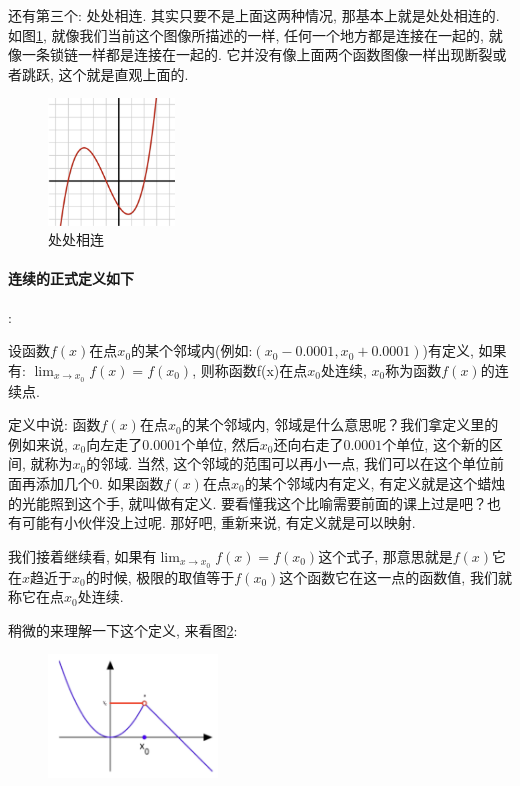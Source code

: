 还有第三个: 处处相连. 其实只要不是上面这两种情况, 那基本上就是处处相连的. 如图\ref{fig:img9_3}, 就像我们当前这个图像所描述的一样, 任何一个地方都是连接在一起的, 就像一条锁链一样都是连接在一起的. 它并没有像上面两个函数图像一样出现断裂或者跳跃, 这个就是直观上面的. 

\begin{figure}[ht]
  \centering
  \includegraphics[width=0.3\textwidth]{asset/a5406854-3b3e-427c-b296-e56f004f1568.png}
  \caption{处处相连}
  \label{fig:img9_3}
\end{figure}

\paragraph{连续的正式定义如下}:

\begin{newquotation}
  设函数$f(x)$在点$x_0$的某个邻域内(例如:$(x_0 - 0.0001, x_0 + 0.0001)$)有定义, 如果有: \(\lim_{x \to x_0}f(x)=f(x_0)\), 则称函数f(x)在点$x_0$处连续, $x_0$称为函数$f(x)$的连续点. 
\end{newquotation}

定义中说: 函数$f(x)$在点$x_0$的某个邻域内, 邻域是什么意思呢？我们拿定义里的例如来说, $x_0$向左走了$0.0001$个单位, 然后$x_0$还向右走了$0.0001$个单位, 这个新的区间, 就称为$x_0$的邻域. 当然, 这个邻域的范围可以再小一点, 我们可以在这个单位前面再添加几个0. 如果函数$f(x)$在点$x_0$的某个邻域内有定义, 有定义就是这个蜡烛的光能照到这个手, 就叫做有定义. 要看懂我这个比喻需要前面的课上过是吧？也有可能有小伙伴没上过呢. 那好吧, 重新来说, 有定义就是可以映射. 

我们接着继续看, 如果有$\lim_{x \to x_0}f(x)=f(x_0)$这个式子, 那意思就是$f(x)$它在$x$趋近于$x_0$的时候, 极限的取值等于$f(x_0)$这个函数它在这一点的函数值, 我们就称它在点$x_0$处连续. 

稍微的来理解一下这个定义, 来看图\ref{fig:img9_4}: 

\begin{figure}[ht]
  \centering
  \includegraphics[width=0.4\textwidth]{asset/00036f9b-aad5-4c4e-b1a2-c7a287d93f1d.png}
  \caption{}
  \label{fig:img9_4}
\end{figure}

